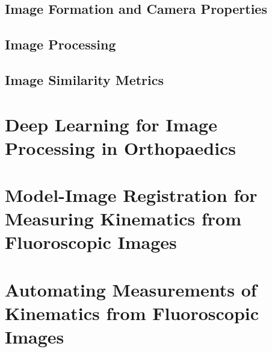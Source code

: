 \subsection{Image Formation and Camera Properties}
\label{sec:img-form-camera-props}


\subsection{Image Processing}
\label{sec:image-processing}


\subsection{Image Similarity Metrics}
\label{sec:image-similarity}


\section{Deep Learning for Image Processing in Orthopaedics}
\label{sec:deep-learning}


\section{Model-Image Registration for Measuring Kinematics from Fluoroscopic Images}
\label{sec:model-image-registration}


\section{Automating Measurements of Kinematics from Fluoroscopic Images}
\label{sec:autonomous-kinematics}

